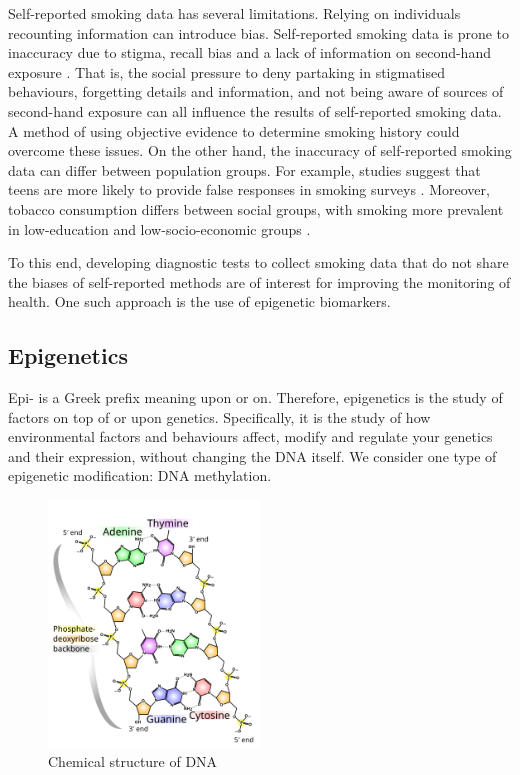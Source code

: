 \documentclass{article}
\begin{document}
Self-reported smoking data has several limitations. Relying on individuals recounting information can introduce bias. Self-reported smoking data is prone to inaccuracy due to stigma, recall bias and a lack of information on second-hand exposure \cite{park2015correlation, gorber2009accuracy}. That is, the social pressure to deny partaking in stigmatised behaviours, forgetting details and information, and not being aware of sources of second-hand exposure can all influence the results of self-reported smoking data. A method of using objective evidence to determine smoking history could overcome these issues. On the other hand, the inaccuracy of self-reported smoking data can differ between population groups. For example, studies suggest that teens are more likely to provide false responses in smoking surveys \cite{park2015correlation}. Moreover, tobacco consumption differs between social groups, with smoking more prevalent in low-education and low-socio-economic groups \cite{cdc2019_smoking}.

To this end, developing diagnostic tests to collect smoking data that do not share the biases of self-reported methods are of interest for improving the monitoring of health. One such approach is the use of epigenetic biomarkers.

\subsection{Epigenetics}
Epi- is a Greek prefix meaning upon or on. Therefore, epigenetics is the study of factors on top of or upon genetics. Specifically, it is the study of how environmental factors and behaviours affect, modify and regulate your genetics and their expression, without changing the DNA itself. We consider one type of epigenetic modification: DNA methylation.

\begin{figure}
    \centering
    \includegraphics[width=0.5\textwidth]{512px-DNA_chemical_structure.svg.png}
    \caption*{Chemical structure of DNA \cite{ball_DNA_structure}}
\end{figure}
\end{document}

